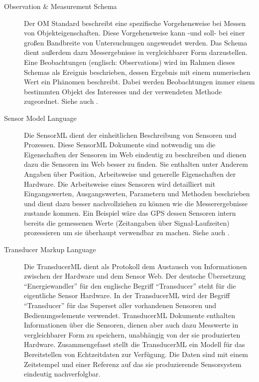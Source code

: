 \begin{description}
\item[Observation \& Measurement Schema] Der \gls{OM} Standard beschreibt eine spezifische Vorgehensweise bei Messen von Objekteigenschaften. Diese Vorgehensweise kann -und soll- bei einer großen Bandbreite von Untersuchungen angewendet werden. Das Schema dient außerdem dazu Messergebnisse in vergleichbarer Form darzustellen. Eine Beobachtungen (englisch: Observations) wird im Rahmen dieses Schemas als Ereignis beschrieben, dessen Ergebnis mit einem numerischen Wert ein Phänomen beschreibt. Dabei werden Beobachtungen immer einem bestimmten Objekt des Interesses und der verwendeten Methode zugeordnet. Siehe auch \citep{cox_observations_2011}.
\item[Sensor Model Language] Die \gls{SensorML} dient der einheitlichen Beschreibung von Sensoren und Prozessen. Diese \gls{SensorML} Dokumente sind notwendig um die Eigenschaften der Sensoren im Web eindeutig zu beschreiben und dienen dazu die Sensoren im Web besser zu finden. Sie enthalten unter Anderem Angaben über Position, Arbeitsweise und generelle Eigenschaften der Hardware. Die Arbeitsweise eines Sensoren wird detailliert mit Eingangswerten, Ausgangswerten, Parametern und Methoden beschrieben und dient dazu besser nachvollziehen zu können wie die Messerergebnisse zustande kommen. Ein Beispiel wäre das \gls{GPS} dessen Sensoren intern bereits die gemessenen Werte (Zeitangaben über Signal-Laufzeiten) prozessieren um sie überhaupt verwendbar zu machen. Siehe auch \citep{botts_opengis_2007}.
\item[Transducer Markup Language] Die \gls{TransducerML} dient als Protokoll dem Austausch von Informationen zwischen der Hardware und dem Sensor Web. Der deutsche Übersetzung ``Energiewandler'' für den englische Begriff ``Transducer'' steht für die eigentliche Sensor Hardware. In der \gls{TransducerML} wird der Begriff ``Transducer'' für das Superset aller vorhandenen Sensoren und Bedienungselemente verwendet. 
\gls{TransducerML} Dokumente enthalten Informationen über die Sensoren, dienen aber auch dazu Messwerte in vergleichbarer Form zu speichern, unabhängig von der sie produzierten Hardware. Zusammengefasst stellt die \gls{TransducerML} ein Modell für das Bereitstellen von Echtzeitdaten zur Verfügung. Die Daten sind mit einem Zeitstempel und einer Referenz auf das sie produzierende Sensorsystem eindeutig nachverfolgbar.

\end{description}
